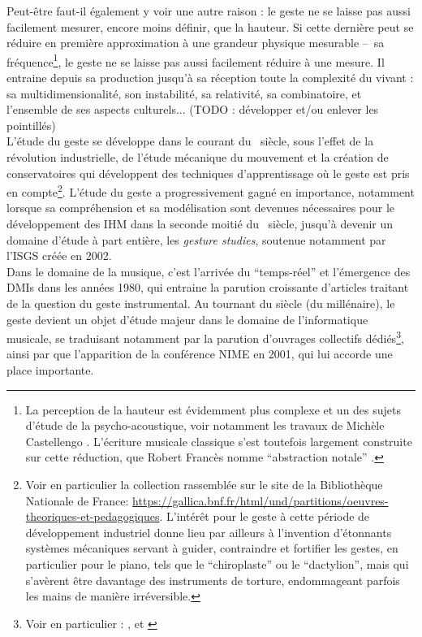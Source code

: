 \indent Peut-être faut-il également y voir une autre raison : le geste ne se laisse pas aussi facilement mesurer, encore moins définir, que la hauteur. Si cette dernière peut se  réduire en première approximation à une grandeur physique mesurable --~sa fréquence\footnote{La perception de la hauteur est évidemment plus complexe et un des sujets d'étude de la psycho-acoustique, voir notamment les travaux de Michèle Castellengo \cite{castellengo_ecoute_2015}. L'écriture musicale classique s'est toutefois largement construite sur cette réduction, que Robert Francès nomme ``abstraction notale'' \cite{frances_perception_1984}.}, le geste ne se laisse pas aussi facilement réduire à une mesure. Il entraine depuis sa production jusqu'à sa réception toute la complexité du vivant : sa multidimensionalité, son instabilité, sa relativité, sa combinatoire, et l'ensemble de ses aspects culturels... (TODO : développer et/ou enlever les pointillés)\\
\indent L'étude du geste se développe dans le courant du ~siècle, sous l'effet de la révolution industrielle, de l'étude mécanique du mouvement et la création de conservatoires qui développent des techniques d'apprentissage où le geste est pris en compte\footnote{Voir en particulier la collection rassemblée sur le site de la Bibliothèque Nationale de France: \url{https://gallica.bnf.fr/html/und/partitions/oeuvres-theoriques-et-pedagogiques}. L'intérêt pour le geste à cette période de développement industriel donne lieu par ailleurs à l'invention d'étonnants systèmes mécaniques servant à guider, contraindre et fortifier les gestes, en particulier pour le piano, tels que le ``chiroplaste'' ou le ``dactylion'', mais qui s'avèrent être davantage des instruments de torture, endommageant parfois les mains de manière irréversible.}. L'étude du geste a progressivement gagné en importance, notamment lorsque sa compréhension et sa modélisation sont devenues nécessaires pour le développement des \gls{IHM} dans la seconde moitié du ~siècle, jusqu'à devenir un domaine d'étude à part entière, les \textit{gesture studies}, soutenue notamment par l'\gls{ISGS} créée en 2002.\\
\indent Dans le domaine de la musique, c'est l'arrivée du ``temps-réel'' et l'émergence des \glspl{DMI} dans les années 1980, qui entraine la parution croissante d'articles traitant de la question du geste instrumental. Au tournant du siècle (du millénaire), le geste devient un objet d'étude majeur dans le domaine de l'informatique musicale, se traduisant notamment par la parution d'ouvrages collectifs dédiés\footnote{Voir en particulier : \cite{genevois_les_1999}, \cite{wanderley_trends_2000} et \cite{godoy_musical_2010}}, ainsi par que l'apparition de la conférence \gls{NIME} en 2001, qui lui accorde une place importante.\\
